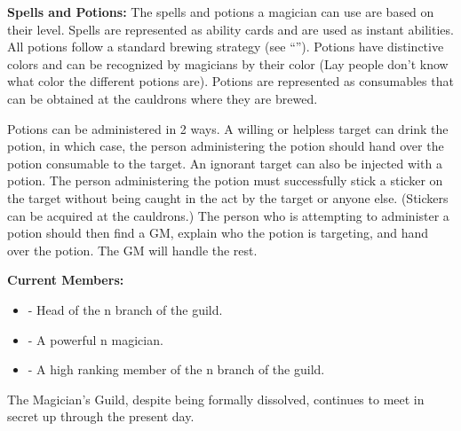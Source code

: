 \documentclass[blue]{NeptuneBall}
\begin{document}
{\bf Spells and Potions:}
The spells and potions a magician can use are based on their level. Spells are represented as ability cards and are used as instant abilities. All potions follow a standard brewing strategy (see ``\gPotions{}''). Potions have distinctive colors and can be recognized by magicians by their color (Lay people don't know what color the different potions are). Potions are represented as consumables that can be obtained at the cauldrons where they are brewed.

Potions can be administered in 2 ways. A willing or helpless target can drink the potion, in which case, the person administering the potion should hand over the potion consumable to the target. An ignorant target can also be injected with a potion. The person administering the potion must successfully stick a sticker on the target without being caught in the act by the target or anyone else. (Stickers can be acquired at the cauldrons.) The person who is attempting to administer a potion should then find a GM, explain who the potion is targeting, and hand over the potion. The GM will handle the rest.

{\bf Current Members:}
\begin{itemize}
\item \cManta{} - Head of the \pAtlantis{}n branch of the guild.
\item \cWitch{\MYname} - A powerful \pAtlantis{}n magician.
\item \cBodyguard{} - A high ranking member of the \pPacifica{}n branch of the guild.
\end{itemize}

\begin{itemz}[Trivia]
  \item The Magician's Guild, despite being formally dissolved, continues to meet in secret up through the present day.
\end{itemz}
\end{document}
